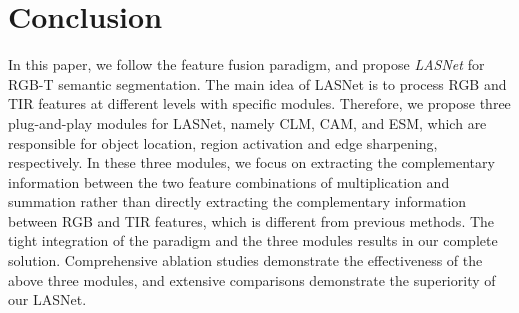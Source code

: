 \documentclass[journal]{IEEEtran}
\begin{document}
\section{Conclusion}
\label{sec:con}
In this paper, we follow the feature fusion paradigm, and propose \emph{LASNet} for RGB-T semantic segmentation.
The main idea of LASNet is to process RGB and TIR features at different levels with specific modules.
Therefore, we propose three plug-and-play modules for LASNet, namely CLM, CAM, and ESM, which are responsible for object location, region activation and edge sharpening, respectively.
In these three modules, we focus on extracting the complementary information between the two feature combinations of multiplication and summation rather than directly extracting the complementary information between RGB and TIR features, which is different from previous methods.
The tight integration of the paradigm and the three modules results in our complete solution.
Comprehensive ablation studies demonstrate the effectiveness of the above three modules, and extensive comparisons demonstrate the superiority of our LASNet.







\ifCLASSOPTIONcaptionsoff
  \newpage
\fi
















\iffalse
\begin{IEEEbiography}{Michael Shell}
Biography text here.
\end{IEEEbiography}

\begin{IEEEbiographynophoto}{John Doe}
Biography text here.
\end{IEEEbiographynophoto}



\begin{IEEEbiographynophoto}{Jane Doe}
Biography text here.
\end{IEEEbiographynophoto}
\fi
\end{document}
